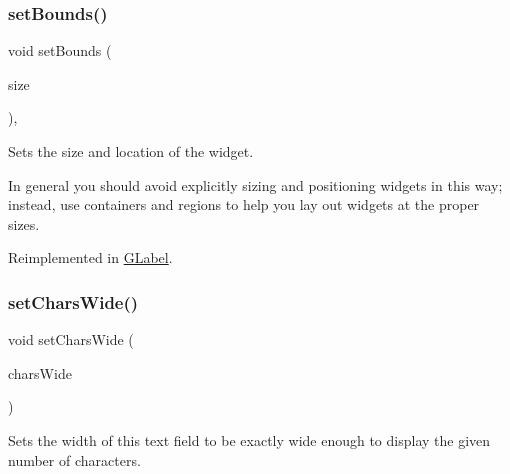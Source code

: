 \subsubsection{\texorpdfstring{set\+Bounds()}{setBounds()}\hspace{0.1cm}{\footnotesize\ttfamily [2/2]}}
{\footnotesize\ttfamily void set\+Bounds (\begin{DoxyParamCaption}\item[{const \mbox{\hyperlink{structsgl_1_1GRectangle}{G\+Rectangle}} \&}]{size }\end{DoxyParamCaption})\hspace{0.3cm}{\ttfamily [virtual]}, {\ttfamily [inherited]}}



Sets the size and location of the widget. 

In general you should avoid explicitly sizing and positioning widgets in this way; instead, use containers and regions to help you lay out widgets at the proper sizes. 

Reimplemented in \mbox{\hyperlink{classsgl_1_1GLabel_adb836652705fdc4b7e90b7a3afc56a37}{G\+Label}}.

\mbox{\label{classsgl_1_1GTextField_aef8026e0b00b17dbccfc456e75308f16}} 
\subsubsection{\texorpdfstring{set\+Chars\+Wide()}{setCharsWide()}}
{\footnotesize\ttfamily void set\+Chars\+Wide (\begin{DoxyParamCaption}\item[{int}]{chars\+Wide }\end{DoxyParamCaption})\hspace{0.3cm}{\ttfamily [virtual]}}



Sets the width of this text field to be exactly wide enough to display the given number of characters. 

\mbox{\label{classsgl_1_1GInteractor_abd40af6921242584d0954f173911b190}} 
